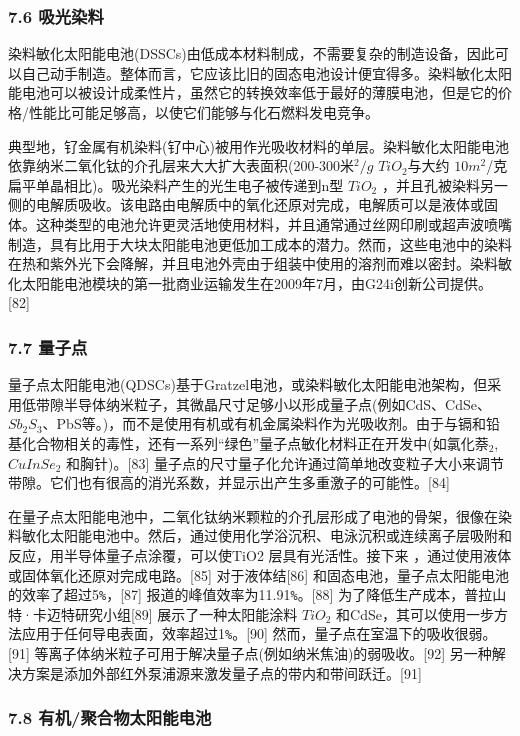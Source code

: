 \subsubsection{7.6 吸光染料}

染料敏化太阳能电池(DSSCs)由低成本材料制成，不需要复杂的制造设备，因此可以自己动手制造。整体而言，它应该比旧的固态电池设计便宜得多。染料敏化太阳能电池可以被设计成柔性片，虽然它的转换效率低于最好的薄膜电池，但是它的价格/性能比可能足够高，以使它们能够与化石燃料发电竞争。

典型地，钌金属有机染料(钌中心)被用作光吸收材料的单层。染料敏化太阳能电池依靠纳米二氧化钛的介孔层来大大扩大表面积(200-300米$^2/g$ $TiO_2$与大约 $10 m^2$/克扁平单晶相比)。吸光染料产生的光生电子被传递到n型 $TiO_2$ ，并且孔被染料另一侧的电解质吸收。该电路由电解质中的氧化还原对完成，电解质可以是液体或固体。这种类型的电池允许更灵活地使用材料，并且通常通过丝网印刷或超声波喷嘴制造，具有比用于大块太阳能电池更低加工成本的潜力。然而，这些电池中的染料在热和紫外光下会降解，并且电池外壳由于组装中使用的溶剂而难以密封。染料敏化太阳能电池模块的第一批商业运输发生在2009年7月，由G24i创新公司提供。[82]

\subsubsection{7.7 量子点}

量子点太阳能电池(QDSCs)基于Gratzel电池，或染料敏化太阳能电池架构，但采用低带隙半导体纳米粒子，其微晶尺寸足够小以形成量子点(例如CdS、CdSe、 $Sb_2S_3$、PbS等。)，而不是使用有机或有机金属染料作为光吸收剂。由于与镉和铅基化合物相关的毒性，还有一系列“绿色”量子点敏化材料正在开发中(如氯化萘$_2$, $CuInSe_2$ 和胸针)。[83] 量子点的尺寸量子化允许通过简单地改变粒子大小来调节带隙。它们也有很高的消光系数，并显示出产生多重激子的可能性。[84]

在量子点太阳能电池中，二氧化钛纳米颗粒的介孔层形成了电池的骨架，很像在染料敏化太阳能电池中。然后，通过使用化学浴沉积、电泳沉积或连续离子层吸附和反应，用半导体量子点涂覆，可以使TiO2 层具有光活性。接下来 ，通过使用液体或固体氧化还原对完成电路。[85] 对于液体结[86] 和固态电池，量子点太阳能电池的效率了超过5\verb|%|，[87] 报道的峰值效率为11.91\verb|%|。[88] 为了降低生产成本，普拉山特·卡迈特研究小组[89] 展示了一种太阳能涂料 $TiO_2$ 和CdSe，其可以使用一步方法应用于任何导电表面，效率超过1\verb|%|。[90] 然而，量子点在室温下的吸收很弱。[91] 等离子体纳米粒子可用于解决量子点(例如纳米焦油)的弱吸收。[92] 另一种解决方案是添加外部红外泵浦源来激发量子点的带内和带间跃迁。[91]

\subsubsection{7.8 有机/聚合物太阳能电池}


